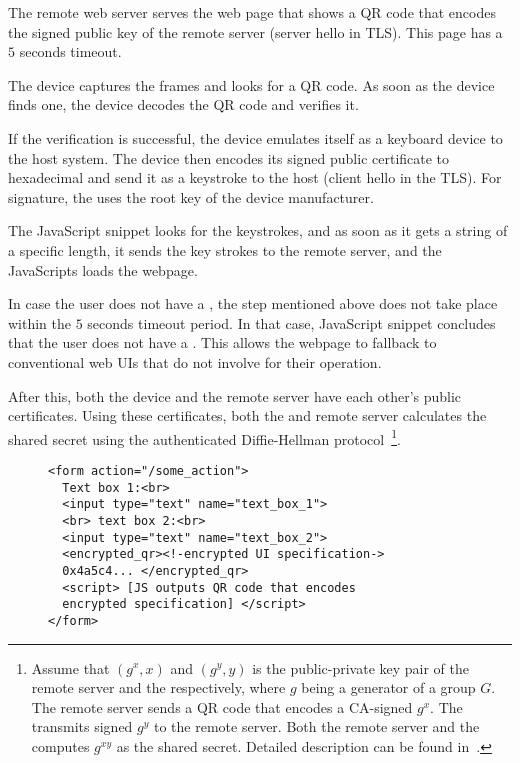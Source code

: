 \begin{mylist}
  \item The remote web server serves the web page that shows a QR code that encodes the signed public key of the remote server (server hello in TLS). This page has a $5$ seconds timeout.
  \item The device captures the frames and looks for a QR code. As soon as the device finds one, the device decodes the QR code and verifies it.
  \item If the verification is successful, the device emulates itself as a keyboard device to the host system. The device then encodes its signed public certificate to hexadecimal and send it as a keystroke to the host (client hello in the TLS). For signature, the \device uses the root key of the device manufacturer.
  \item The \name  JavaScript snippet looks for the keystrokes, and as soon as it gets a string of a specific length, it sends the key strokes to the remote server, and the \name JavaScripts loads the webpage.
  \item In case the user does not have a \device, the step mentioned above does not take place within the $5$ seconds timeout period. In that case, \name JavaScript snippet concludes that the user does not have a \device. This allows the webpage to fallback to conventional web UIs that do not involve \device for their operation.
\end{mylist}

After this, both the device and the remote server have each other's public certificates. Using these certificates, both the \device and remote server calculates the shared secret using the authenticated Diffie-Hellman protocol~\footnote{Assume that $(g^x, x)$ and $(g^y, y)$ is the public-private key pair of the remote server and the \device respectively, where $g$ being a generator of a group $G$. The remote server sends a QR code that encodes a CA-signed $g^x$. The \device transmits signed $g^y$ to the remote server. Both the remote server and the \device computes $g^{xy}$ as the shared secret. Detailed description can be found  in~\cite{blake1998authenticated}.}.




\begin{figure}[t]
\small
\begin{lstlisting}[mathescape=true]
<form action="/some_action">
  Text box 1:<br>
  <input type="text" name="text_box_1">
  <br> text box 2:<br>
  <input type="text" name="text_box_2">
  <encrypted_qr><!-encrypted UI specification->
  0x4a5c4... </encrypted_qr>
  <script> [JS outputs QR code that encodes 
  encrypted specification] </script>
</form> 
\end{lstlisting} 
\end{figure}



